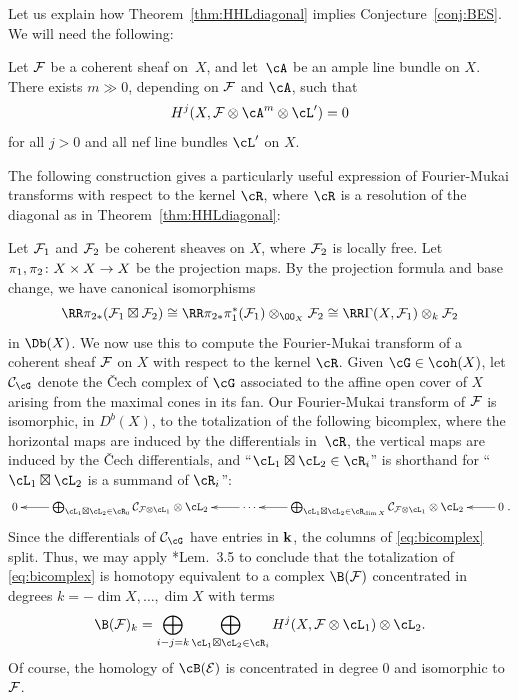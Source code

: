 \documentclass{amsart}
\begin{document}
Let us explain how Theorem~\ref{thm:HHLdiagonal} implies Conjecture~\ref{conj:BES}. We will need the following:

\begin{thm}
\label{thm:fujita}
Let $\mathcal{F}$ be a coherent sheaf on~$X$, and let~$\cA$ be an ample line bundle on $X$. There exists $m \gg 0$, depending on $\mathcal{F}$ and $\cA$, such that
$$
H^j(X,\F \otimes \cA^m \otimes \cL') = 0
$$
for all $j > 0$ and all nef line bundles $\cL'$ on $X$.
\end{thm}

The following construction gives a particularly useful expression of Fourier-Mukai transforms with respect to the kernel $\cR$, where $\cR$ is a resolution of the diagonal as in Theorem~\ref{thm:HHLdiagonal}:

\begin{construction}
\label{const:monad}
Let $\mathcal{F}_1$ and $\mathcal{F}_2$ be coherent sheaves on $X$, where $\mathcal{F}_2$ is locally free. Let $\pi_1, \pi_2 \colon X \times X \to X$ be the projection maps. By the projection formula and base change, we have canonical isomorphisms
\[ \RR\pi_{2*}(\F_1\boxtimes\F_2) \cong \RR\pi_{2*}\pi^*_1(\F_1)\otimes_{\OO_{X}}\F_2 \cong \RR\Gamma(X, \F_1) \otimes_k \F_2 \]
in $\Db(X)$. We now use this to compute the Fourier-Mukai transform of a coherent sheaf $\mathcal{F}$ on $X$ with respect to the kernel $\cR$. Given $\cG \in \coh(X)$, let $\cC_{\cG}$ denote the \v{C}ech complex of $\cG$ associated to the affine open cover of $X$ arising from the maximal cones in its fan. Our Fourier-Mukai transform of $\mathcal{F}$ is isomorphic, in $D^b(X)$, to the totalization of the following  bicomplex, where the horizontal maps are induced by the differentials in~$\cR$, the vertical maps are induced by the \v{C}ech differentials,  and
``$\cL_1 \boxtimes \cL_2 \in \cR_i$'' is shorthand for ``$\cL_1 \boxtimes \cL_2$ is a summand of $\cR_i$'':
\begin{equation}\label{eq:bicomplex}
  \xymatrix{
    0 & \ar[l] \bigoplus_{\cL_1\boxtimes\cL_2 \in \cR_0} \cC_{\F\otimes\cL_1} \otimes \cL_2 & \ar[l] \cdots
    &   \ar[l] \bigoplus_{\cL_1\boxtimes\cL_2 \in \cR_{\dim{X}}} \cC_{\F\otimes\cL_1} \otimes \cL_2 & \ar[l] 0}.
\end{equation}
Since the differentials of $\cC_{\cG}$ have entries in ${\bf k}$, the columns of \eqref{eq:bicomplex} split. Thus, we may apply \cite{EFS03}*{Lem.~3.5} to conclude that the totalization of \eqref{eq:bicomplex} is homotopy equivalent to a complex $\B(\F)$ concentrated in degrees $k=-\dim{X},\dots,\dim{X}$ with terms
\begin{equation}\label{eq:BM}
  \B(\F)_k
  = \bigoplus_{i-j=k} \bigoplus_{\cL_1\boxtimes\cL_2 \in \cR_i} H^j(X, \F\otimes\cL_1) \otimes\cL_2.
\end{equation}
Of course, the homology of $\cB(\E)$ is concentrated in degree 0 and isomorphic to $\mathcal{F}$. 
\end{construction}
\end{document}
